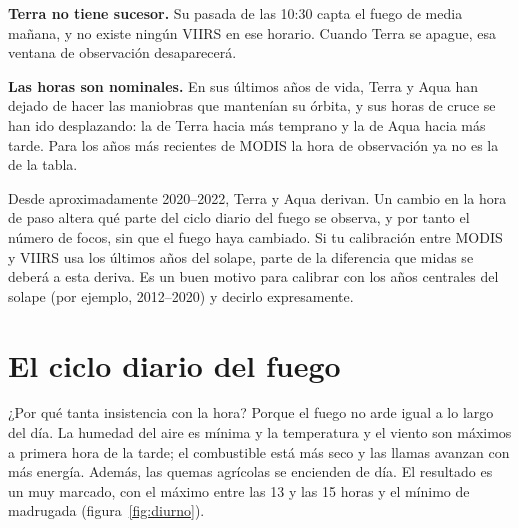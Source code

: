 \textbf{Terra no tiene sucesor.} Su pasada de las 10:30 capta el fuego de media mañana, y no
existe ningún VIIRS en ese horario. Cuando Terra se apague, esa ventana de observación
desaparecerá.

\textbf{Las horas son nominales.} En sus últimos años de vida, Terra y Aqua han dejado de hacer
las maniobras que mantenían su órbita, y sus horas de cruce se han ido desplazando: la de Terra
hacia más temprano y la de Aqua hacia más tarde. Para los años más recientes de MODIS la hora de
observación ya no es la de la tabla.

\begin{atencion}
Desde aproximadamente 2020--2022, Terra y Aqua derivan. Un cambio en la hora de paso altera qué
parte del ciclo diario del fuego se observa, y por tanto el número de focos, sin que el fuego
haya cambiado. Si tu calibración entre MODIS y VIIRS usa los últimos años del solape, parte de
la diferencia que midas se deberá a esta deriva. Es un buen motivo para calibrar con los años
centrales del solape (por ejemplo, 2012--2020) y decirlo expresamente.
\end{atencion}

\section{El ciclo diario del fuego}

¿Por qué tanta insistencia con la hora? Porque el fuego no arde igual a lo largo del día. La
humedad del aire es mínima y la temperatura y el viento son máximos a primera hora de la tarde;
el combustible está más seco y las llamas avanzan con más energía. Además, las quemas agrícolas
se encienden de día. El resultado es un  muy marcado, con el máximo entre
las 13 y las 15 horas y el mínimo de madrugada (figura~\ref{fig:diurno}).

